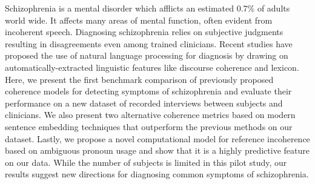 Schizophrenia is a mental disorder which afflicts an estimated 0.7\% of adults world wide. It affects many areas of mental function, often evident from incoherent speech. Diagnosing schizophrenia relies on subjective judgments resulting in disagreements even among trained clinicians. Recent studies have proposed the use of natural language processing for diagnosis by drawing on automatically-extracted linguistic features like discourse coherence and lexicon. Here, we present the first benchmark comparison of previously proposed coherence models for detecting symptoms of schizophrenia and evaluate their performance on a new dataset of recorded interviews between subjects and clinicians. We also present two alternative coherence metrics based on modern sentence embedding techniques that outperform the previous methods on our dataset. Lastly, we propose a novel computational model for reference incoherence based on ambiguous pronoun usage and show that it is a highly predictive feature on our data. While the number of subjects is limited in this pilot study, our results suggest new directions for diagnosing common symptoms of schizophrenia.
